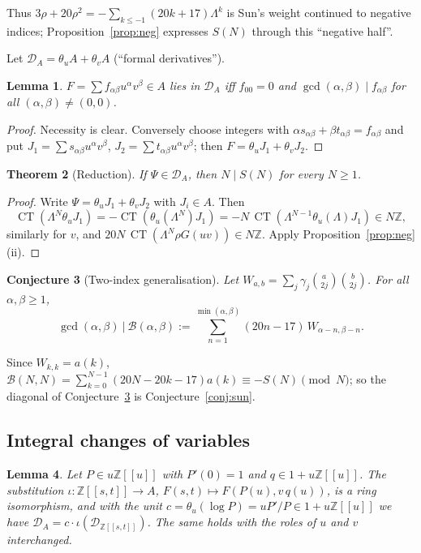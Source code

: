\documentclass[11pt]{amsart}
\newtheorem{theorem}{Theorem}[section]
\newtheorem{lemma}[theorem]{Lemma}
\newtheorem{conjecture}[theorem]{Conjecture}
\theoremstyle{definition}
\newcommand{\Z}{\mathbb{Z}}
\newcommand{\CT}{\operatorname{CT}}
\newcommand{\Der}{\mathcal{D}}
\begin{document}
Thus $3\rho+20\rho^2=-\sum_{k\le-1}(20k+17)\Lambda^k$ is Sun's weight continued to negative
indices; Proposition~\ref{prop:neg} expresses $S(N)$ through this ``negative half''.

Let $\Der_A=\theta_uA+\theta_vA$ (``formal derivatives'').

\begin{lemma}\label{lem:fd}
$F=\sum f_{\alpha\beta}u^\alpha v^\beta\in A$ lies in $\Der_A$ iff $f_{00}=0$ and
$\gcd(\alpha,\beta)\mid f_{\alpha\beta}$ for all $(\alpha,\beta)\ne(0,0)$.
\end{lemma}

\begin{proof}
Necessity is clear. Conversely choose integers with
$\alpha s_{\alpha\beta}+\beta t_{\alpha\beta}=f_{\alpha\beta}$ and put
$J_1=\sum s_{\alpha\beta}u^\alpha v^\beta$, $J_2=\sum t_{\alpha\beta}u^\alpha v^\beta$; then
$F=\theta_uJ_1+\theta_vJ_2$.
\end{proof}

\begin{theorem}[Reduction]\label{thm:red}
If $\Psi\in\Der_A$, then $N\mid S(N)$ for every $N\ge1$.
\end{theorem}

\begin{proof}
Write $\Psi=\theta_uJ_1+\theta_vJ_2$ with $J_i\in A$. Then
\[
\CT(\Lambda^N\theta_uJ_1)=-\CT(\theta_u(\Lambda^N)J_1)=-N\,\CT(\Lambda^{N-1}\theta_u(\Lambda)J_1)\in N\Z,
\]
similarly for $v$, and $20N\,\CT(\Lambda^N\rho G(uv))\in N\Z$. Apply
Proposition~\ref{prop:neg}(ii).
\end{proof}

\begin{conjecture}[Two-index generalisation]\label{conj:B}
Let $W_{a,b}=\sum_j\gamma_j\binom a{2j}\binom b{2j}$. For all $\alpha,\beta\ge1$,
\[
\gcd(\alpha,\beta)\ \Big|\ \mathcal B(\alpha,\beta):=\sum_{n=1}^{\min(\alpha,\beta)}(20n-17)\,
W_{\alpha-n,\beta-n}.
\]
\end{conjecture}

Since $W_{k,k}=a(k)$, $\mathcal B(N,N)=\sum_{k=0}^{N-1}(20N-20k-17)a(k)\equiv-S(N)\pmod N$; so the
diagonal of Conjecture~\ref{conj:B} is Conjecture~\ref{conj:sun}.

\subsection{Integral changes of variables}
\begin{lemma}\label{lem:inv}
Let $P\in u\Z[[u]]$ with $P'(0)=1$ and $q\in1+u\Z[[u]]$. The substitution
$\iota\colon\Z[[s,t]]\to A$, $F(s,t)\mapsto F(P(u),v\,q(u))$, is a ring isomorphism, and with the
unit $c=\theta_u(\log P)=uP'/P\in1+u\Z[[u]]$ we have $\Der_A=c\cdot\iota(\Der_{\Z[[s,t]]})$.
The same holds with the roles of $u$ and $v$ interchanged.
\end{lemma}
\end{document}
